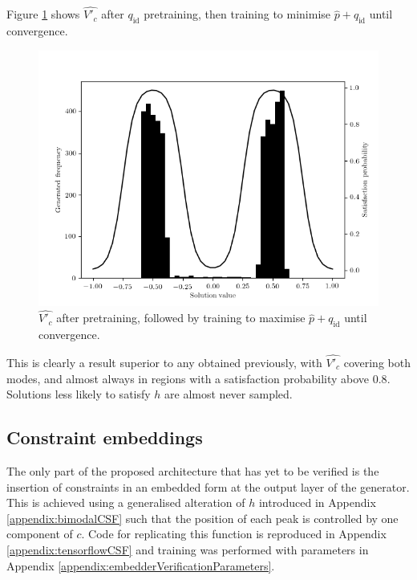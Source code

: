\documentclass[../../main.tex]{subfiles}
\begin{document}
Figure \ref{fig:identityAndPrecision} shows $\hat{V'_c}$ after $q_\text{id}$ pretraining, then training to minimise $\hat{p}+q_\text{id}$ until convergence.
\begin{figure}[H]
    \begin{center}
    \includegraphics[width=\textwidth]{identityAndPrecision}
    \caption[Generator after combined training]{
        $\hat{V'_c}$ after pretraining, followed by training to maximise $\hat{p}+q_\text{id}$ until convergence.
    }
    \label{fig:identityAndPrecision}
    \end{center}
\end{figure}
This is clearly a result superior to any obtained previously, with $\hat{V'_c}$ covering both modes, and almost always in regions with a satisfaction probability above $0.8$.
Solutions less likely to satisfy $h$ are almost never sampled.

\subsection{Constraint embeddings} \label{subsection:constraintEmbeddings}

The only part of the proposed architecture that has yet to be verified is the insertion of constraints in an embedded form at the output layer of the generator.
This is achieved using a generalised alteration of $h$ introduced in Appendix \ref{appendix:bimodalCSF} such that the position of each peak is controlled by one component of $c$.
Code for replicating this function is reproduced in Appendix \ref{appendix:tensorflowCSF} and training was performed with parameters in Appendix \ref{appendix:embedderVerificationParameters}.
\end{document}
